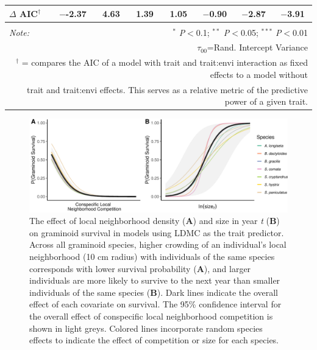 \documentclass[12pt, letterpaper]{article}
\begin{document}
\begin{table}[h]
{\begin{tabular}{lccccccc}
\hline 
\rowcolor[gray]{.95}$\Delta$ AIC$^\dagger$ & $-$-2.37 & 4.63 & 1.39 & 1.05 & $-$0.90 & $-$2.87 & $-$3.91 \\
\hline 
\hline \\[-1.8ex] 
\textit{Note:}  & \multicolumn{7}{r}{$^{*}$ \textit{P}$<$0.1; $^{**}$ \textit{P}$<$0.05; $^{***}$ \textit{P}$<$0.01} \\ 
\multicolumn{8}{r}{$\tau_{00}$=Rand. Intercept Variance}\\ 
\multicolumn{8}{r}{$^\dagger$ = compares the AIC of a model with trait and trait:envi interaction as fixed effects to a model without}\\
\multicolumn{8}{r}{trait and trait:envi effects. This serves as a relative metric of the predictive power of a given trait.}
\end{tabular} }
\end{table} 

\begin{figure}
    \centering
    \includegraphics[width=.8\textwidth]{survEffectPlots-1.pdf}
    \caption{The effect of local neighborhood density (\textbf{A}) and size in year \textit{t} (\textbf{B}) on graminoid survival in models using LDMC as the trait predictor. Across all graminoid species, higher crowding of an individual’s local neighborhood (10 cm radius) with individuals of the same species corresponds with lower survival probability (\textbf{A}), and larger individuals are more likely to survive to the next year than smaller individuals of the same species (\textbf{B}). Dark lines indicate the overall effect of each covariate on survival. The 95\% confidence interval for the overall effect of conspecific local neighborhood competition is shown in light greys. Colored lines incorporate random species effects to indicate the effect of competition or size for each species.}
    \label{fig:Effects_Survival}
\end{figure}
\end{document}
